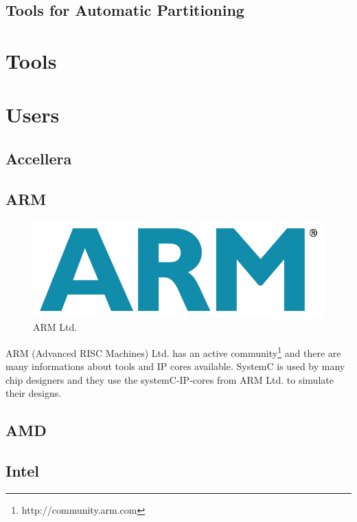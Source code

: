 \documentclass{article}
\begin{document}
	  \subsection{Tools for Automatic Partitioning}
	  
	\section{Tools}

	\section{Users}
	  \subsection{Accellera}
	  \subsection{ARM}
	    \begin{figure}[hp]
	      \centering
	      \includegraphics[scale=0.18]{../pictures/armlogo.jpg}
	      \caption{ARM Ltd.}
	      \label{fig:arm}
	    \end{figure}  
	    ARM (Advanced RISC Machines) Ltd. has an active community\footnote{http://community.arm.com} and there are many informations about tools and IP cores available.
	    SystemC is used by many chip designers and they use the systemC-IP-cores from ARM Ltd. to simulate their designs.
	  \subsection{AMD}
	  
	  \subsection{Intel}
	  
\end{document}
